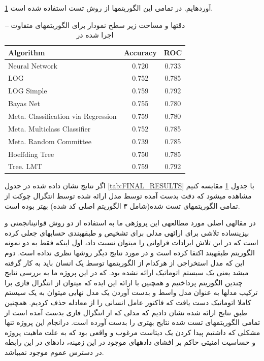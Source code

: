 \documentclass[journal]{IEEEtran}
\newcommand{\نیمفاصله}{\halfspace}
\renewcommand{\ }{\halfspace}
\newcommand{\وکا}{\lr{WEKA} }
\newcommand{\ار}{\lr{R} }
\renewcommand{\|}[1][.3em]{\hspace{#1}|\hspace{#1}}
\renewcommand{\,}[1][.3em]{,\hspace{#1}}
\begin{document}
\ref{tab:OTHER_RESULTS}
آورده\ ایم. در تمامی این الگوریتم\ ها از روش تست
\mbox{}
استفاده شده است.
\begin{table}[ht]\small
\centering
\def\arraystretch{1.5}
\begin{latin}
\begin{tabular}{l|c|c}
Algorithm & Accuracy & ROC \\\hline
Neural Network   & 0.720 & 0.733 \\
LOG & 0.752 & 0.785 \\
LOG Simple & 0.759 & 0.792\\
Bayas Net & 0.755 & 0.780\\
Meta. Classification via Regression & 0.759 & 0.780\\
Meta. Multiclass Classifier & 0.752 & 0.785\\
Meta. Random Committee & 0.739 & 0.785\\
Hoeffding Tree & 0.750 & 0.785\\
Tree. LMT & 0.759 & 0.792
\end{tabular}
\end{latin}
\caption{دقت\ ها و مساحت زیر سطح نمودار
برای الگوریتم\ های متفاوت -- اجرا شده در \وکا
}
\label{tab:OTHER_RESULTS}
\end{table}
اگر نتایج نشان داده شده در جدول
\ref{tab:FINAL_RESULTS}
با جدول
\ref{tab:OTHER_RESULTS}
مقایسه کنیم مشاهده می\ شود که دقت بدست آمده توسط مدل ارائه شده توسط انتگرال چوکت از تمامی الگوریتم\ های تست شده(شامل ۳ الگوریتم اصلی کد شده) بهتر بوده است.

\قسمت{نتیجه\ گیری}
در مقاله\ ی اصلی\
\cite{PAPER:MAIN}
مورد مطالعه\ ی این پروژه\ ی ما به استفاده از دو روش قوانین\ انجمنی و بیزین\ ساده تلاشی برای ارائه\ ی مدلی برای تشخیص و طبقهی حساب\ های جعلی کرده است که در این تلاش ایرادات فراوانی را می\ توان نسبت داد،‌ اول اینکه فقط به دو نمونه الگوریتم طبقه\ بند اکتفا کرده است و در مورد نتایج دیگر روش\ ها نظری نداده است. دوم این که مدل استخراجی از هرکدام از الگوریتم\ ها توسط یک انسان باید به کار گرفته می\ شد یعنی یک سیستم اتوماتیک ارائه نشده بود. که در این پروژه ما به بررسی نتایج چندین الگوریتم پرداختیم و همچنین با ارائه این ایده که می\ توان از انتگرال فازی برا ترکیب مدل\ ها به عنوان مدل واسط و بدست آوردن یک مدل نهایی می\ توان به یک سیستم کاملا اتوماتیک دست یافت که فاکتور عامل انسانی را از معادله حذف کردیم.\بند
همچنین طبق نتایج ارائه شده نشان دادیم که مدلی که از انتگرال فازی بدست آمده است از تمامی الگوریتم\ های تست شده نتایج بهتری را بدست آورده است. درانجام این پروژه تنها مشکلی که داشتیم پیدا کردن یک دیتاست مرغوب و واقعی بود که به علت ماهیت پروژه و حساسیت امنیتی حاکم بر افشای داده\ های موجود در این زمینه، داده\ ای در این رابطه در دسترس عموم موجود نمی\ باشد.
\end{document}
